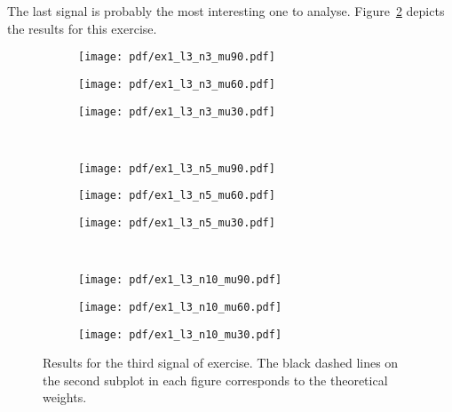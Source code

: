 The last signal is probably the most interesting one to analyse.
Figure~\ref{fig:ex1vsig3} depicts the results for this exercise.
\begin{figure}[t!]
    \centering
    \begin{subfigure}[t]{0.32\columnwidth}
        \centering
        \texttt{[image: pdf/ex1\_l3\_n3\_mu90.pdf]}
        \caption{}
    \end{subfigure} \hfill
    \begin{subfigure}[t]{0.32\columnwidth}
        \centering
        \texttt{[image: pdf/ex1\_l3\_n3\_mu60.pdf]}
        \caption{}
    \end{subfigure} \hfill
    \begin{subfigure}[t]{0.32\columnwidth}
        \centering
        \texttt{[image: pdf/ex1\_l3\_n3\_mu30.pdf]}
        \caption{}
    \end{subfigure} \\
    \begin{subfigure}[t]{0.32\columnwidth}
        \centering
        \texttt{[image: pdf/ex1\_l3\_n5\_mu90.pdf]}
        \caption{}
    \end{subfigure} \hfill
    \begin{subfigure}[t]{0.32\columnwidth}
        \centering
        \texttt{[image: pdf/ex1\_l3\_n5\_mu60.pdf]}
        \caption{}
    \end{subfigure} \hfill
    \begin{subfigure}[t]{0.32\columnwidth}
        \centering
        \texttt{[image: pdf/ex1\_l3\_n5\_mu30.pdf]}
        \caption{}
    \end{subfigure} \\
    \begin{subfigure}[t]{0.32\columnwidth}
        \centering
        \texttt{[image: pdf/ex1\_l3\_n10\_mu90.pdf]}
        \caption{}
    \end{subfigure} \hfill
    \begin{subfigure}[t]{0.32\columnwidth}
        \centering
        \texttt{[image: pdf/ex1\_l3\_n10\_mu60.pdf]}
        \caption{}
    \end{subfigure} \hfill
    \begin{subfigure}[t]{0.32\columnwidth}
        \centering
        \texttt{[image: pdf/ex1\_l3\_n10\_mu30.pdf]}
        \caption{\label{fig:ex1vsig3n10mu3}}
    \end{subfigure}
    \caption{Results for the third signal of exercise. The black dashed lines on
        the second subplot in each figure corresponds to the theoretical weights.
        \label{fig:ex1vsig3}}
\end{figure}

